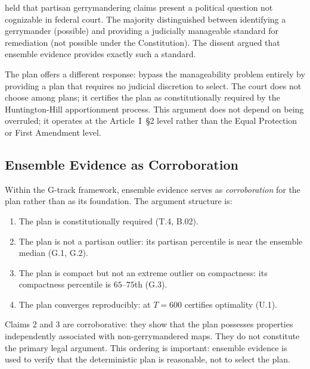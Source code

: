 \rucho{} held that partisan gerrymandering claims present a political question
not cognizable in federal court.  The majority distinguished between identifying
a gerrymander (possible) and providing a judicially manageable standard for
remediation (not possible under the Constitution).  The dissent argued that
ensemble evidence provides exactly such a standard.

The \ar{} plan offers a different response: bypass the manageability problem
entirely by providing a plan that requires no judicial discretion to select.
The court does not choose among plans; it certifies the \ar{} plan as
constitutionally required by the Huntington-Hill apportionment process.
This argument does not depend on \rucho{} being overruled; it operates at the
Article~I~\S2 level rather than the Equal Protection or First Amendment level.

\subsection{Ensemble Evidence as Corroboration}

Within the G-track framework, ensemble evidence serves as \emph{corroboration}
for the \ar{} plan rather than as its foundation.  The argument structure is:

\begin{enumerate}
  \item The \ar{} plan is constitutionally required (T.4, B.02).
  \item The \ar{} plan is not a partisan outlier: its partisan percentile
    is near the ensemble median (G.1, G.2).
  \item The \ar{} plan is compact but not an extreme outlier on compactness:
    its compactness percentile is $65$--$75$th (G.3).
  \item The \ar{} plan converges reproducibly: \cs{} at $T = 600$ certifies
    optimality (U.1).
\end{enumerate}

Claims 2 and 3 are corroborative: they show that the \ar{} plan possesses
properties independently associated with non-gerrymandered maps.  They do not
constitute the primary legal argument.  This ordering is important: ensemble
evidence is used to verify that the deterministic plan is reasonable, not to
select the plan.
